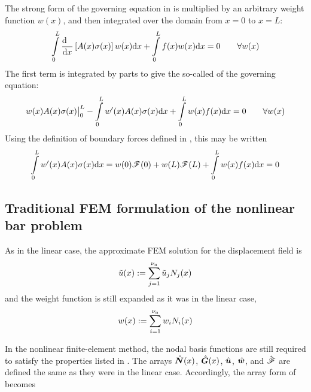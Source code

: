 The strong form of the governing equation in  is multiplied by an arbitrary weight function  $w(x)$, and then integrated over the domain from $x=0$ to $x=L$:
\begin{equation}
  \int\limits_0^L \frac{\mathrm{d}~~}{\mathrm{d} x}\left[A(x) {\sigma}(x)\right] w(x)\mathrm{d} x  +  \int\limits_0^L f(x)w(x)\mathrm{d} x=0
\qquad\forall w(x)
\end{equation}
The first term is integrated by parts to give the so-called  of the governing equation:
\begin{equation}
  w(x) A(x) {\sigma}(x) \big|_0^L-\int\limits_0^L w'(x) A(x) {\sigma}(x)\mathrm{d} x  +  \int\limits_0^L w(x)f(x)\mathrm{d} x=0
\qquad\forall w(x)
\label{eq:nonLinearBarWeakForm}
\end{equation}
Using the definition of boundary forces defined in , this may be written
\begin{equation}
 \int\limits_0^L w'(x)A(x) {\sigma}(x) \mathrm{d} x = w(0)\mathscr{F}(0)+w(L)\mathscr{F}(L)  +  \int\limits_0^L w(x)f(x)\mathrm{d} x=0
\label{eq:nonLinearBarWeakFormWithForcesc}
\end{equation}




\subsection{Traditional FEM formulation of the nonlinear bar problem}
\label{sec:nonLinearBarFEM}
As in the linear case, the approximate FEM solution for the displacement field is
\begin{equation}
  \tilde{u}(x):=\sum\limits_{j=1}^{{\nu_\text{n}}}\tilde{u}_j {N}_j(x)
\label{eq:nonLinaprxuc}
\end{equation}
and the weight function is still expanded as it was in the linear case,
\begin{equation}
  w(x):=\sum\limits_{i=1}^{{\nu_\text{n}}}w_i {N}_i(x)
\label{eq:nonLinweightc}
\end{equation}

In the nonlinear finite-element method, the nodal basis functions are still required to satisfy the properties listed in . The arrays $\hat{\bm{N}}(x)$, $\hat{\bm{G}}(x)$, $\hat{\bm{u}}$, $\hat{\bm{w}}$, and $\hat{\bm{\mathscr{F}}}$ are defined the same as they were in the linear case. Accordingly, the array form of  becomes

